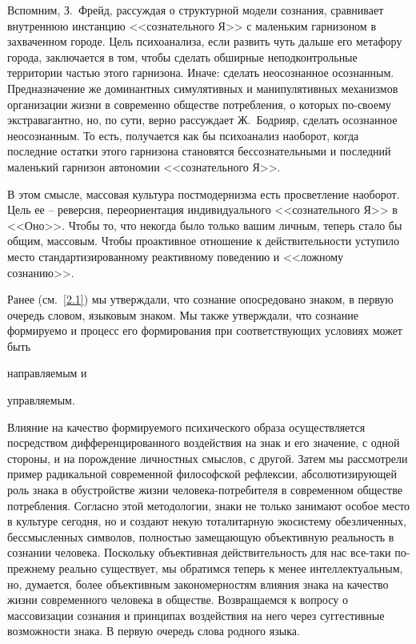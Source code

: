 Вспомним, З.~Фрейд, рассуждая о структурной модели сознания, сравнивает внутреннюю
инстанцию <<сознательного Я>> с маленьким гарнизоном в захваченном городе.\autocite[][116]{freud1992}
Цель психоанализа, если развить чуть дальше его метафору города, заключается в том,
чтобы сделать обширные неподконтрольные территории частью этого гарнизона.
Иначе: сделать неосознанное осознанным. Предназначение же доминантных симулятивных
и манипулятивных механизмов организации жизни в современно обществе потребления, о
которых по-своему экстравагантно, но, по сути, верно рассуждает Ж.~Бодрияр, сделать
осознанное неосознанным. То есть, получается как бы психоанализ наоборот, когда
последние остатки этого гарнизона становятся бессознательными и последний маленький
гарнизон автономии <<сознательного Я>>.

В этом смысле, массовая культура постмодернизма есть просветление наоборот.
Цель ее -- реверсия, переориентация индивидуального <<сознательного Я>> в <<Оно>>.
Чтобы то, что некогда было только вашим личным, теперь стало бы общим, массовым.
Чтобы проактивное отношение к действительности уступило место стандартизированному
реактивному поведению и <<ложному сознанию>>.\autocite[][89]{eagleton1991ideology}

Ранее (см.~\ref{2.1}) мы утверждали, что сознание опосредовано знаком, в первую
очередь словом, языковым знаком. Мы также утверждали, что сознание формируемо и
процесс его формирования при соответствующих условиях может быть
\begin{enumerate*}[label=\asbuk*)]
    \item направляемым и
    \item управляемым.
\end{enumerate*}
Влияние на качество формируемого психического образа осуществляется
посредством дифференцированного воздействия на знак и его значение, с одной стороны,
и на порождение личностных смыслов, с другой. Затем мы рассмотрели пример
радикальной современной философской рефлексии, абсолютизирующей роль знака в
обустройстве жизни человека-потребителя в современном обществе потребления.
Согласно этой методологии, знаки не только занимают особое место в культуре
сегодня, но и создают некую тоталитарную экосистему обезличенных, бессмысленных
символов, полностью замещающую объективную реальность в сознании человека.
Поскольку объективная действительность для нас все-таки по-прежнему реально
существует, мы обратимся теперь к менее интеллектуальным, но, думается, более
объективным закономерностям влияния знака на качество жизни современного человека в
обществе. Возвращаемся к вопросу о массовизации сознания и принципах воздействия
на него через суггестивные возможности знака. В первую очередь слова родного языка.

